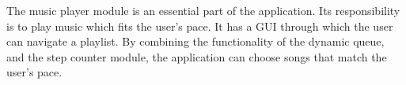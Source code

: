The music player module is an essential part of the application. Its responsibility is to play music which fits the user's pace. It has a GUI through which the user can navigate a playlist. By combining the functionality of the dynamic queue, and the step counter module, the application can choose songs that match the user's pace.